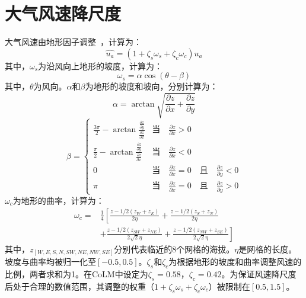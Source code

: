 \section{大气风速降尺度}\label{大气风速降尺度}
大气风速由地形因子调整~\citep{liston2006Meteorological}，计算为：
\begin{equation}
\hat{u_{a}}=\left(1+\zeta_{s}\omega_{s}+\zeta_{c}\omega_{c}\right)u_{a}
\end{equation}
其中，$\omega_{s}$为沿风向上地形的坡度，计算为：
\begin{equation}
\omega_{s}=\alpha \cos{\left(\theta-\beta\right)}
\end{equation}
其中，$\theta$为风向。$\alpha$和$\beta$为地形的坡度和坡向，分别计算为：
\begin{equation}
\alpha=\arctan \sqrt{\frac{\partial z}{\partial x}+\frac{\partial z}{\partial y}}
\end{equation}
%
\begin{equation}
\beta=\begin{cases}
    \frac{3\pi}{2}-\arctan \frac{\frac{\partial z}{\partial y}}{\frac{\partial z}{\partial x}} & \text{当}\quad \frac{\partial z}{\partial x}>0 \\
    \frac{\pi}{2}-\arctan \frac{\frac{\partial z}{\partial y}}{\frac{\partial z}{\partial x}} & \text{当}\quad \frac{\partial z}{\partial x}<0 \\
    0 & \text{当}\quad \frac{\partial z}{\partial x}=0\quad \text{且}\quad \frac{\partial z}{\partial y}<0 \\
    \pi & \text{当}\quad \frac{\partial z}{\partial x}=0\quad \text{且}\quad \frac{\partial z}{\partial y}>0 
\end{cases}
\end{equation}
$\omega_{c}$为地形的曲率，计算为：
\begin{equation}
   \begin{split}
    \omega_{c}=&\frac{1}{4}\left[\frac{z-1/2\left(z_{W}+z_{E}\right)}{2\eta}+\frac{z-1/2\left(z_{S}+z_{N}\right)}{2\eta}\right. \\
    & \left.+\frac{z-1/2\left(z_{SW}+z_{NE}\right)}{2\sqrt{2}\eta}+\frac{z-1/2\left(z_{NW}+z_{SE}\right)}{2\sqrt{2}\eta}\right]
   \end{split}
\end{equation}
其中，$z_{[W,E,S,N,SW,NE,NW,SE]}$分别代表临近的8个网格的海拔。$\eta$是网格的长度。坡度与曲率均被归一化至$[-0.5,0.5]$。$\zeta_{s}$和$\zeta_{c}$为根据地形的坡度和曲率调整风速的比例，两者求和为1。在CoLM中设定为$\zeta_{s}=0.58$，$\zeta_{c}=0.42$。为保证风速降尺度后处于合理的数值范围，其调整的权重（$1+\zeta_{s}\omega_{s}+\zeta_{c}\omega_{c}$）被限制在$[0.5,1.5]$。

